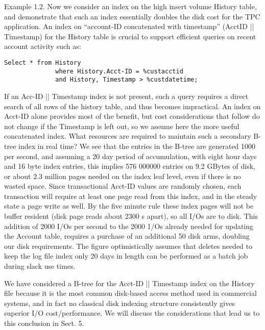 \documentclass[a4paper,12pt,notitlepage,twoside,openright]{article}
\begin{document}
Example 1.2. Now we consider an index on the high insert volume History
table, and demonstrate that such an index essentially doubles the disk
cost for the TPC application. An index on ``account-ID concatenated with
timestamp'' (AcctID || Timestamp) for the History table is crucial to
support efficient queries on recent account activity such as:

\begin{verbatim}
Select * from History
              where History.Acct-ID = %custacctid
              and History, Timestamp > %custdatetime;
\end{verbatim}

If an Acc-ID || Timestamp index is not present, such a query requires a
direct search of all rows of the history table, and thus becomes
impractical. An index on Acct-ID alone provides most of the benefit, but
cost considerations that follow do not change if the Timestamp is left
out, so we assume here the more useful concatenated index. What
resources are required to maintain such a secondary B-tree index in real
time? We see that the entries in the B-tree are generated 1000 per
second, and assuming a 20 day period of accumulation, with eight hour
days and 16 byte index entries, this implies 576 000000 entries on 9.2
GBytes of disk, or about 2.3 million pages needed on the index leaf
level, even if there is no wasted space. Since transactional Acct-ID
values are randomly chosen, each transaction will require at least one
page read from this index, and in the steady state a page write as well.
By the five minute rule these index pages will not be buffer resident
(disk page reads about 2300 s apart), so all I/Os are to disk. This
addition of 2000 I/Os per second to the 2000 1/Os already needed for
updating the Account table, requires a purchase of an additional 50 disk
arms, doubling our disk requirements. The figure optimistically assumes
that deletes needed to keep the log file index only 20 days in length
can be performed as a batch job during slack use times.

We have considered a B-tree for the Acct-ID || Timestamp index on the
History file because it is the most common disk-based access method used
in commercial systems, and in fact no classical disk indexing structure
consistently gives superior I/O cost/performance. We will discuss the
considerations that lead us to this conclusion in Sect. 5.
\end{document}

